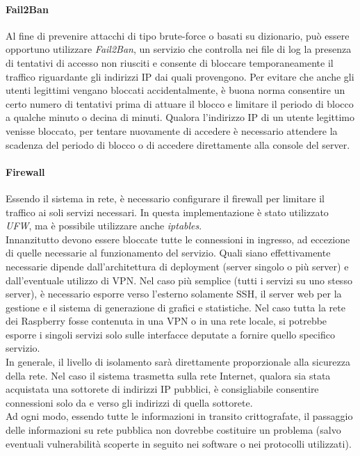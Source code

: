 \paragraph{Fail2Ban}
Al fine di prevenire attacchi di tipo brute-force o basati su dizionario, può essere opportuno utilizzare \textit{Fail2Ban}, un servizio che controlla nei file di log la presenza di tentativi di accesso non riusciti e consente di bloccare temporaneamente il traffico riguardante gli indirizzi IP dai quali provengono.
Per evitare che anche gli utenti legittimi vengano bloccati accidentalmente, è buona norma consentire un certo numero di tentativi prima di attuare il blocco e limitare il periodo di blocco a qualche minuto o decina di minuti.
Qualora l'indirizzo IP di un utente legittimo venisse bloccato, per tentare nuovamente di accedere è necessario attendere la scadenza del periodo di blocco o di accedere direttamente alla console del server.
\paragraph{Firewall}
Essendo il sistema in rete, è necessario configurare il firewall per limitare il traffico ai soli servizi necessari. In questa implementazione è stato utilizzato \textit{UFW}, ma è possibile utilizzare anche \textit{iptables}.
\\Innanzitutto devono essere bloccate tutte le connessioni in ingresso, ad eccezione di quelle necessarie al funzionamento del servizio. Quali siano effettivamente necessarie dipende dall'architettura di deployment (server singolo o più server) e dall'eventuale utilizzo di VPN.
Nel caso più semplice (tutti i servizi su uno stesso server), è necessario esporre verso l'esterno solamente SSH, il server web per la gestione e il sistema di generazione di grafici e statistiche.
Nel caso tutta la rete dei Raspberry fosse contenuta in una VPN o in una rete locale, si potrebbe esporre i singoli servizi solo sulle interfacce deputate a fornire quello specifico servizio.
\\In generale, il livello di isolamento sarà direttamente proporzionale alla sicurezza della rete.
Nel caso il sistema trasmetta sulla rete Internet, qualora sia stata acquistata una sottorete di indirizzi IP pubblici, è consigliabile consentire connessioni solo da e verso gli indirizzi di quella sottorete.
\\Ad ogni modo, essendo tutte le informazioni in transito crittografate, il passaggio delle informazioni su rete pubblica non dovrebbe costituire un problema (salvo eventuali vulnerabilità scoperte in seguito nei software o nei protocolli utilizzati).

